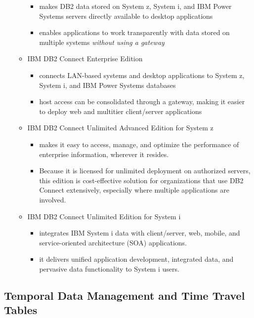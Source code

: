 \documentclass{article}
\begin{document}
\begin{itemize}
\begin{itemize}
		\begin{itemize}
			\item makes DB2 data stored on System z, System i, and IBM Power Systems servers directly available to desktop applications
			\item enables applications to work transparently with data stored on multiple systems \textit{without using a gateway}
		\end{itemize}
	\item IBM DB2 Connect Enterprise Edition
		\begin{itemize}
			\item connects LAN-based systems and desktop applications to System z, System i, and IBM Power Systems databases
			\item host access can be consolidated through a gateway, making it easier to deploy web and multitier client/server applications
		\end{itemize}
	\item IBM DB2 Connect Unlimited Advanced Edition for System z
		\begin{itemize}
			\item makes it easy to access, manage, and optimize the performance of enterprise information, wherever it resides.
			\item Because it is licensed for unlimited deployment on authorized servers, this edition is cost-effective solution for organizations that
			use DB2 Connect extensively, especially where multiple applications are involved.
		\end{itemize}
	\item IBM DB2 Connect Unlimited Edition for System i
		\begin{itemize}
			\item integrates IBM System i data with client/server, web, mobile, and service-oriented architecture (SOA) applications.
			\item it delivers unified application development, integrated data, and pervasive data functionality to System i users.
		\end{itemize}
	\end{itemize}
\end{itemize}

\subsection{Temporal Data Management and Time Travel Tables}
\end{document}
